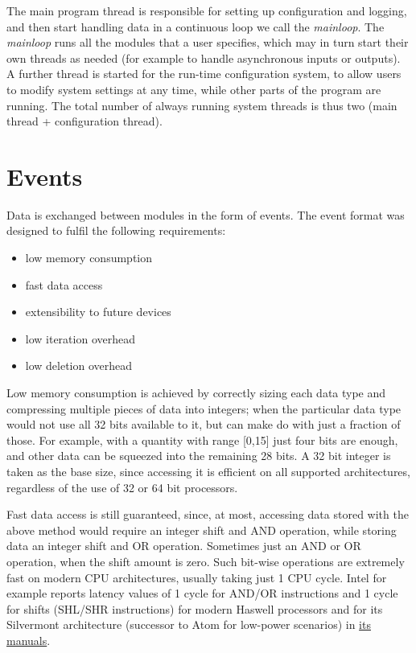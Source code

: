 \documentclass[a4paper,12pt]{report}
\begin{document}
The main program thread is responsible for setting up configuration and logging, and then start handling data in a continuous loop we call the \emph{mainloop}. The \emph{mainloop} runs all the modules that a user specifies, which may in turn start their own threads as needed (for example to handle asynchronous inputs or outputs).
A further thread is started for the run-time configuration system, to allow users to modify system settings at any time, while other parts of the program are running.
The total number of always running system threads is thus two (main thread + configuration thread).

\section{Events} \label{sec:events}

Data is exchanged between modules in the form of events.
The event format was designed to fulfil the following requirements:
\begin{itemize}
\item low memory consumption
\item fast data access
\item extensibility to future devices
\item low iteration overhead
\item low deletion overhead
\end{itemize}

Low memory consumption is achieved by correctly sizing each data type and compressing multiple pieces of data into integers; when the particular data type would not use all 32 bits available to it, but can make do with just a fraction of those. For example, with a quantity with range [0,15] just four bits are enough, and other data can be squeezed into the remaining 28 bits. A 32 bit integer is taken as the base size, since accessing it is efficient on all supported architectures, regardless of the use of 32 or 64 bit processors.

Fast data access is still guaranteed, since, at most, accessing data stored with the above method would require an integer shift and AND operation, while storing data an integer shift and OR operation. Sometimes just an AND or OR operation, when the shift amount is zero. Such bit-wise operations are extremely fast on modern CPU architectures, usually taking just 1 CPU cycle. Intel for example reports latency values of 1 cycle for AND/OR instructions and 1 cycle for shifts (SHL/SHR instructions) for modern Haswell processors and for its Silvermont architecture (successor to Atom for low-power scenarios) in \href{https://software.intel.com/en-us/articles/intel-sdm}{its manuals}.
\end{document}
